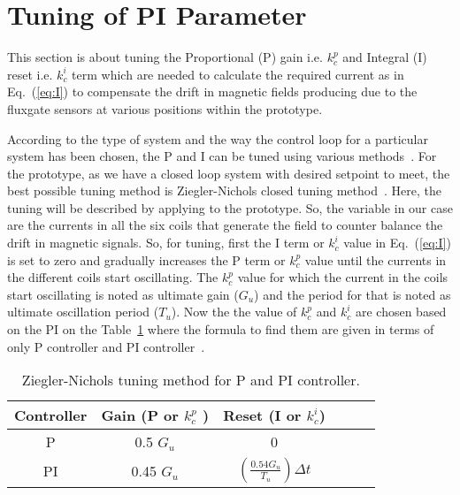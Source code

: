 \section{Tuning of PI Parameter}\label{sec:tune}
This section is about tuning the Proportional (P) gain i.e. $k_c^p$ and Integral (I) reset i.e. $k_c^i$ term which are needed to calculate the required current as in Eq.~(\ref{eq:I}) to compensate the drift in magnetic fields producing due to the fluxgate sensors at various positions within the prototype.



According to the type of system and the way the control loop for a particular system has been chosen, the P and I can be tuned using various methods~\cite{tuning}. For the prototype, as we have a closed loop system with desired setpoint to meet, the best possible tuning method is Ziegler-Nichols closed tuning method~\cite{tuning_ZN}. Here, the tuning will be described by applying to the prototype. So, the variable in our case are the currents in all the six coils that generate the field to counter balance the drift in magnetic signals. So, for tuning, first the I term or $k_c^i$ value in Eq.~(\ref{eq:I}) is set to zero and gradually increases the P term or $k_c^p$ value until the currents in the different coils start oscillating. The $k_c^p$ value for which the current in the coils start oscillating is noted as ultimate gain ($G_{u}$) and the period for that is noted as ultimate oscillation period ($T_u$). Now the the value of $k_c^p$ and $k_c^i$ are chosen based on the PI on the Table~\ref{table:tuning} where the formula to find them are given in terms of only P controller and PI controller~\cite{tuning_formula}. 

\begin{table} [htb!]
    \centering
    \begin{tabular} { |c|c|c|c|c|c|} 
        \hline
        Controller & Gain (P or $k_c^p$ ) & Reset (I or $k_c^i$)\\
        \hline\hline
         P & 0.5 $G_u$ & 0 \\ 
        \hline
         PI & 0.45 $G_u$ & $\left(\frac{\text{0.54} G_u}{T_u}\right)\Delta t$ \\ 
        \hline
    \end{tabular}
    \caption{Ziegler-Nichols tuning method for P and PI controller. }\label{table:tuning}
\end{table}

